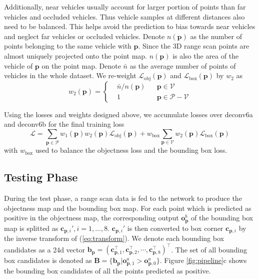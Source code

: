 \documentclass[conference]{IEEEtran}
\begin{document}
Additionally, near vehicles usually account for larger portion of points than far vehicles and occluded vehicles. Thus vehicle samples at different distances also need to be balanced. This helps avoid the prediction to bias towards near vehicles and neglect far vehicles or occluded vehicles. Denote $n(\mathbf{p})$ as the number of points belonging to the same vehicle with $\mathbf{p}$. Since the 3D range scan points are almost uniquely projected onto the point map. $n(\mathbf{p})$ is also the area of the vehicle of $\mathbf{p}$ on the point map. Denote $\bar{n}$ as the average number of points of vehicles in the whole dataset. We re-weight $\mathcal{L}_\textrm{obj}(\mathbf{p})$ and $\mathcal{L}_\textrm{box}(\mathbf{p})$ by $w_2$ as
\begin{equation}
w_2(\mathbf{p}) = \left \{
\begin{aligned}
    &\bar{n} / n(\mathbf{p}) & & {\mathbf{p} \in \mathcal{V}} \\
    &1 & & {\mathbf{p} \in \mathcal{P} - \mathcal{V}}
\end{aligned}
\right.
\end{equation}

Using the losses and weights designed above, we accumulate losses over deconv6a and deconv6b for the final training loss
\begin{equation}
    \mathcal{L} = \sum_{\mathbf{p} \in \mathcal{P}} w_1(\mathbf{p}) w_2(\mathbf{p}) \mathcal{L}_\textrm{obj}(\mathbf{p}) + w_\textrm{box} \sum_{\mathbf{p} \in \mathcal{V}} w_2(\mathbf{p}) \mathcal{L}_\textrm{box}(\mathbf{p})
\end{equation}
with $w_\textrm{box}$ used to balance the objectness loss and the bounding box loss.


\subsection{Testing Phase}
During the test phase, a range scan data is fed to the network to produce the objectness map and the bounding box map. For each point which is predicted as positive in the objectness map, the corresponding output $\mathbf{o}^b_{\mathbf{p}}$ of the bounding box map is splitted as $\mathbf{c}_{\mathbf{p}, i}', i = 1, \dots, 8$. $\mathbf{c}_{\mathbf{p}, i}'$ is then converted to box corner $\mathbf{c}_{\mathbf{p}, i}$ by the inverse transform of (\ref{eq:transform}). We denote each bounding box candidates as a 24d vector $\mathbf{b}_\mathbf{p} = (\mathbf{c}_{\mathbf{p}, 1}^\top, \mathbf{c}_{\mathbf{p}, 2}^\top, \cdots, \mathbf{c}_{\mathbf{p}, 8}^\top)^\top$. The set of all bounding box candidates is denoted as $\mathbf{B} = \{\mathbf{b}_\mathbf{p} | \mathbf{o}^a_{\mathbf{p}, 1} > \mathbf{o}^a_{\mathbf{p}, 0} \}$. Figure \ref{fig:pipeline}c shows the bounding box candidates of all the points predicted as positive. 
\end{document}
